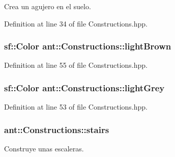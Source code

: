 Crea un agujero en el suelo. 



Definition at line 34 of file Constructions.\+hpp.

\hypertarget{classant_1_1_constructions_a78fa43047a5a82a3d1e9ab276c183181}{
\subsubsection[{light\+Brown}]{\setlength{\rightskip}{0pt plus 5cm}sf\+::\+Color ant\+::\+Constructions\+::light\+Brown\hspace{0.3cm}{\ttfamily [static]}}}\label{classant_1_1_constructions_a78fa43047a5a82a3d1e9ab276c183181}


Definition at line 55 of file Constructions.\+hpp.

\hypertarget{classant_1_1_constructions_a694ef338349eee7bbd42294e467f4bad}{
\subsubsection[{light\+Grey}]{\setlength{\rightskip}{0pt plus 5cm}sf\+::\+Color ant\+::\+Constructions\+::light\+Grey\hspace{0.3cm}{\ttfamily [static]}}}\label{classant_1_1_constructions_a694ef338349eee7bbd42294e467f4bad}


Definition at line 53 of file Constructions.\+hpp.

\hypertarget{classant_1_1_constructions_a19d388ea2eb5a1a55456e1714c657ebb}{
\subsubsection[{stairs}]{ ant\+::\+Constructions\+::stairs\hspace{0.3cm}{\ttfamily [static]}}}\label{classant_1_1_constructions_a19d388ea2eb5a1a55456e1714c657ebb}


Construye unas escaleras. 



